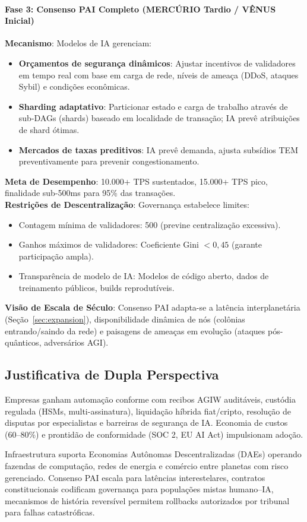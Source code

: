 \documentclass[11pt]{article}
\begin{document}
\paragraph{Fase 3: Consenso PAI Completo (MERCÚRIO Tardio / VÊNUS Inicial)}
\textbf{Mecanismo}: Modelos de IA gerenciam:
\begin{itemize}[noitemsep]
  \item \textbf{Orçamentos de segurança dinâmicos}: Ajustar incentivos de validadores em tempo real com base em carga de rede, níveis de ameaça (DDoS, ataques Sybil) e condições econômicas.
  \item \textbf{Sharding adaptativo}: Particionar estado e carga de trabalho através de sub-DAGs (shards) baseado em localidade de transação; IA prevê atribuições de shard ótimas.
  \item \textbf{Mercados de taxas preditivos}: IA prevê demanda, ajusta subsídios TEM preventivamente para prevenir congestionamento.
\end{itemize}
\textbf{Meta de Desempenho}: 10.000+ TPS sustentados, 15.000+ TPS pico, finalidade sub-500ms para 95\% das transações.\\
\textbf{Restrições de Descentralização}: Governança estabelece limites:
\begin{itemize}[noitemsep]
  \item Contagem mínima de validadores: 500 (previne centralização excessiva).
  \item Ganhos máximos de validadores: Coeficiente Gini $<0,45$ (garante participação ampla).
  \item Transparência de modelo de IA: Modelos de código aberto, dados de treinamento públicos, builds reprodutíveis.
\end{itemize}
\textbf{Visão de Escala de Século}: Consenso PAI adapta-se a latência interplanetária (Seção~\ref{sec:expansion}), disponibilidade dinâmica de nós (colônias entrando/saindo da rede) e paisagens de ameaças em evolução (ataques pós-quânticos, adversários AGI).

\subsection{Justificativa de Dupla Perspectiva}
\begin{description}[style=nextline]
  \item[Curto Prazo (Era MERCÚRIO)] Empresas ganham automação conforme com recibos AGIW auditáveis, custódia regulada (HSMs, multi-assinatura), liquidação híbrida fiat/cripto, resolução de disputas por especialistas e barreiras de segurança de IA. Economia de custos (60--80\%) e prontidão de conformidade (SOC 2, EU AI Act) impulsionam adoção.
  \item[Escala de Século (VÊNUS até ANDROMEDA)] Infraestrutura suporta Economias Autônomas Descentralizadas (DAEs) operando fazendas de computação, redes de energia e comércio entre planetas com risco gerenciado. Consenso PAI escala para latências interestelares, contratos constitucionais codificam governança para populações mistas humano--IA, mecanismos de história reversível permitem rollbacks autorizados por tribunal para falhas catastróficas.
\end{description}
\end{document}
